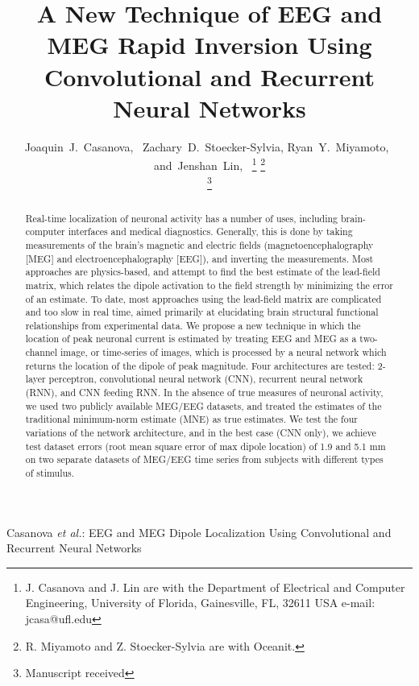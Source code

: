 \documentclass[journal]{IEEEtran}
\begin{document}

\title{A New Technique of EEG and MEG Rapid Inversion Using Convolutional and Recurrent Neural Networks}


\author{Joaquin~J.~Casanova,~
        Zachary~D.~Stoecker-Sylvia,
        Ryan~Y.~Miyamoto,~
        and~Jenshan~Lin,~%
\thanks{J. Casanova and J. Lin are with the Department
of Electrical and Computer Engineering, University of Florida, Gainesville,
FL, 32611 USA e-mail: jcasa@ufl.edu}%
\thanks{R. Miyamoto and Z. Stoecker-Sylvia are with Oceanit.}%

\thanks{Manuscript received }}

%
{Casanova \MakeLowercase{\textit{et al.}}: EEG and MEG Dipole Localization Using Convolutional and Recurrent Neural Networks}
\maketitle

\begin{abstract}

 Real-time localization of neuronal activity has a number of uses, including brain-computer interfaces and medical diagnostics. Generally, this is done by taking measurements of the brain's magnetic and electric fields (magnetoencephalography [MEG] and electroencephalography [EEG]), and inverting the measurements. Most approaches are physics-based, and attempt to find the best estimate of the lead-field matrix, which relates the dipole activation to the field strength by minimizing the error of an estimate. To date, most approaches using the lead-field matrix are complicated and too slow in real time, aimed primarily at elucidating brain structural functional relationships from experimental data. We propose a new technique in which the location of peak neuronal current is estimated by treating EEG and MEG as a two-channel image, or time-series of images, which is processed by a neural network which returns the location of the dipole of peak magnitude. Four architectures are tested: 2-layer perceptron, convolutional neural network (CNN), recurrent neural network (RNN), and CNN feeding RNN. In the absence of true measures of neuronal activity, we used two publicly available MEG/EEG datasets, and treated the estimates of the traditional minimum-norm estimate (MNE) as true estimates. We test the four variations of the network architecture, and in the best case (CNN only), we achieve test dataset errors (root mean square error of max dipole location) of 1.9 and 5.1 mm on two separate datasets of MEG/EEG time series from subjects with different types of stimulus.
  
\end{abstract}
\end{document}
